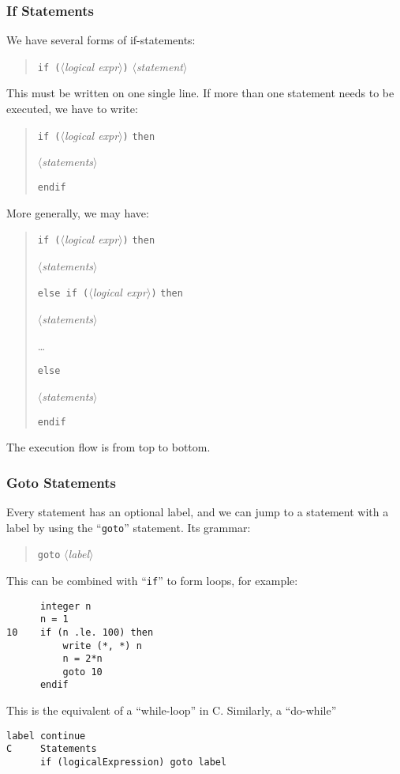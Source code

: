 \subsubsection{If Statements}
We have several forms of if-statements:
\begin{quote}
\noindent\texttt{if (}$\langle$\textit{logical expr\/}$\rangle$\texttt{)} $\langle$\textit{statement\/}$\rangle$
\end{quote}
This must be written on one single line. If more than one statement
needs to be executed, we have to write:
\begin{quotation}
\noindent\texttt{if (}$\langle$\textit{logical expr\/}$\rangle$\texttt{)} \texttt{then}

$\langle$\textit{statements\/}$\rangle$

\noindent\texttt{endif}
\end{quotation}
More generally, we may have:
\begin{quotation}
\noindent\texttt{if (}$\langle$\textit{logical expr\/}$\rangle$\texttt{)} \texttt{then}

$\langle$\textit{statements\/}$\rangle$

\noindent\texttt{else if (}$\langle$\textit{logical expr\/}$\rangle$\texttt{)} \texttt{then}

$\langle$\textit{statements\/}$\rangle$

\dots

\noindent\texttt{else}

$\langle$\textit{statements\/}$\rangle$

\noindent\texttt{endif}
\end{quotation}
The execution flow is from top to bottom.

\subsubsection{Goto Statements}
Every statement has an optional label, and we can jump to a statement
with a label by using the ``\texttt{goto}'' statement. Its grammar:
\begin{quote}
\texttt{goto} $\langle$\textit{label\/}$\rangle$
\end{quote}
This can be combined with ``\texttt{if}'' to form loops, for example:
\begin{lstlisting}
      integer n
      n = 1
10    if (n .le. 100) then
          write (*, *) n
          n = 2*n
          goto 10
      endif
\end{lstlisting}
This is the equivalent of a ``while-loop'' in C. Similarly, a ``do-while''
\begin{lstlisting}
label continue
C     Statements
      if (logicalExpression) goto label
\end{lstlisting}

